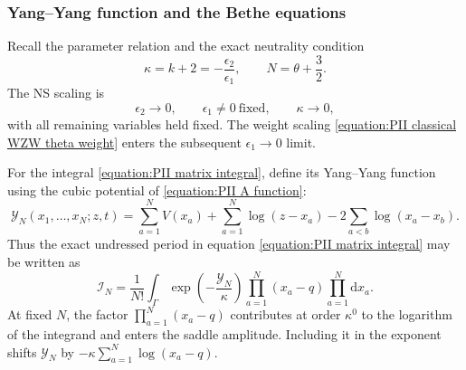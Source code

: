 \documentclass[a4paper,11pt]{article}
\newcommand{\dd}{\mathrm{d}}
\numberwithin{equation}{section}
\begin{document}
\subsubsection{Yang--Yang function and the Bethe equations}

Recall the parameter relation and the exact neutrality condition
\begin{equation}
	\kappa=k+2=-\frac{\epsilon_{2}}{\epsilon_{1}},
	\qquad N=\theta+\frac{3}{2}.
\end{equation}
The NS scaling is
\begin{equation}
	\label{equation:PII NS actual limit}
	\epsilon_{2}\longrightarrow0,
	\qquad \epsilon_{1}\ne0\ \text{fixed},
	\qquad \kappa\longrightarrow0,
\end{equation}
with all remaining variables held fixed.  The weight scaling
\eqref{equation:PII classical WZW theta weight} enters the subsequent
$\epsilon_{1}\to0$ limit.

For the integral \eqref{equation:PII matrix integral}, define its
Yang--Yang function using the cubic potential of
\eqref{equation:PII A function}:
\begin{equation}
	\label{equation:PII NS Yang Yang}
	\mathcal{Y}_{N}(x_{1},\ldots,x_{N};z,t)
	=\sum_{a=1}^{N}V(x_{a})
	+\sum_{a=1}^{N}\log(z-x_{a})
	-2\sum_{a<b}\log(x_{a}-x_{b}).
\end{equation}
Thus the exact undressed period in equation \eqref{equation:PII matrix integral} may be written as
\begin{equation}
	\mathcal{I}_{N}
	=\frac{1}{N!}\int_{\Gamma}
	\exp\left(-\frac{\mathcal{Y}_{N}}{\kappa}\right)
	\prod_{a=1}^{N}(x_{a}-q)\prod_{a=1}^{N}\dd x_{a}.
\end{equation}
At fixed $N$, the factor $\prod_{a=1}^{N}(x_{a}-q)$ contributes at
order $\kappa^{0}$ to the logarithm of the integrand and enters the
saddle amplitude.  Including it in the exponent shifts
$\mathcal{Y}_{N}$ by $-\kappa\sum_{a=1}^{N}\log(x_{a}-q)$.
\end{document}
